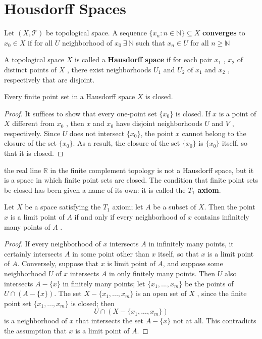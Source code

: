 \documentclass[a4paper,english,12pt]{article}
\begin{document}
\section{Housdorff Spaces}
\begin{defn}
Let $(X,\mathcal{T})$ be topological space. A sequence $\{x_n : n \in \mathbb{N}\} \subseteq X$ \textbf{converges} to $x_0 \in X$ if for all $U$ neighborhood of $x_0 \  \exists \  \mathbb{N}$ such that $x_n \in U$ for all $n \geq \mathbb{N}$
\end{defn}
\begin{defn}
A topological space $X$ is called a\textbf{ Hausdorff space} if for each pair $x_1$ , $x_2$
of distinct points of $X$ , there exist neighborhoods $U_1$ and $U_2$ of $x_1$ and $x_2$ , respectively that are disjoint.
\end{defn}
\begin{thm}
Every finite point set in a Hausdorff space $X$ is closed.
\begin{proof}
It suffices to show that every one-point set $\{x_0\}$ is closed. If $x$ is a point of $X$ different from $x_0$ , then $x$ and $x_0$ have disjoint neighborhoods $U$ and $V$ , respectively. Since $U$ does not intersect $\{x_0\}$, the point $x$ cannot belong to the closure of the set $\{x_0\}$. As a result, the closure of the set $\{x_0\}$ is $\{x_0\}$ itself, so that it is closed.
\end{proof}
\end{thm}
\begin{exmp}
the real line $\mathbb{R}$ in the finite complement topology is not a
Hausdorff space, but it is a space in which finite point sets are closed. The condition that finite point sets be closed has been given a name of its own: it is called the \textbf{$T_1$ axiom}.
\end{exmp}
\begin{thm}
Let $X$ be a space satisfying the $T_1$ axiom; let $A$ be a subset of $X$. Then the point $x$ is a limit point of $A$ if and only if every neighborhood of $x$ contains infinitely many points of $A$ .
\begin{proof}
 If every neighborhood of $x$ intersects $A$ in infinitely many points, it certainly intersects $A$ in some point other than $x$ itself, so that $x$ is a limit point of $A$. Conversely, suppose that $x$ is limit point of $A$, and suppose some neighborhood $U$ of $x$ intersects $A$ in only finitely many points. Then $U$ also intersects $A - \{x\}$ in finitely many points; let $\{x_1 , . . . , x_m \}$ be the points of $U \cap (A - \{x\})$. The set $X - \{x_1 , . . . , x_m\}$ is an open set of $X$ , since the finite point set $\{x_1 , . . . , x_m \}$ is closed;
then
\[U \cap (X - \{x_1 , . . . , x_m \})
\]
is a neighborhood of $x$ that intersects the set $A - \{x\}$ not at all. This contradicts the assumption that $x$ is a limit point of $A$.
\end{proof}
\end{thm}
\end{document}
